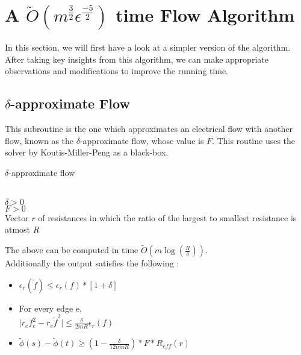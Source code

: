 \documentclass[BTech]{iitmdiss}
\begin{document}
	\section{A $\widetilde{O}(m^{\frac{3}{2}}\epsilon^{\frac{-5}{2}})$ time Flow Algorithm}
	  In this section, we will first have a look at a simpler version of the algorithm. After taking key insights from this algorithm,
	  we can make appropriate observations and modifications to improve the running time. \\
	  \subsection{$\delta$-approximate Flow}
	    This subroutine is the one which approximates an electrical flow with another flow, known as the $\delta$-approximate flow, whose value is
	    $F$. This routine uses the solver by Koutis-Miller-Peng as a black-box.
	  
	  \begin{algorithm}[H]
	   \caption{$\delta$-approximate flow}
	   \KwIn
	      {\\
	      $\delta>0$\\
	      $F>0$ \\
	      Vector $r$ of resistances in which the ratio of the largest to smallest resistance is atmost $R$ \\
	      }
	    
	  \end{algorithm}

	    The above can be computed in time $\widetilde{O}(m \log(\frac{R}{\delta}))$. \\
	    Additionally the output satisfies the following : 
	  \begin{itemize}
	  \item 
	    $\epsilon_r(\widetilde{f}) \leq \epsilon_r(f)\ast [1+\delta]$
	  \item
	    For every edge e, \\
	    
	    $\mid r_e f_e^2 - r_e \widetilde{f}^2 \mid \leq \frac{\delta}{2mR}\epsilon_r(f)$
	  \item
	    $\widetilde{\phi}(s)-\widetilde{\phi}(t) \geq (1-\frac{\delta}{12nmR})\ast F \ast R_{eff}(r)$
	  \end{itemize}
	  
\end{document}

